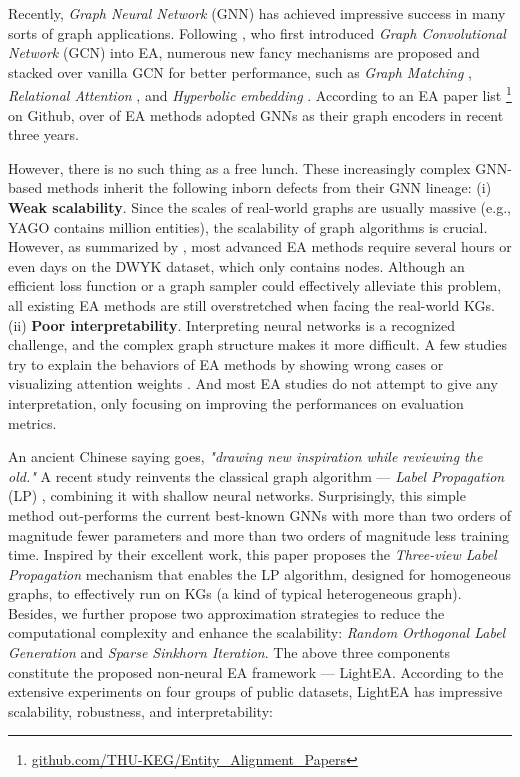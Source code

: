 \documentclass[11pt]{article}
\begin{document}
Recently, \emph{Graph Neural Network} (GNN) has achieved impressive success in many sorts of graph applications.
Following \citet{DBLP:conf/emnlp/WangLLZ18}, who first introduced \emph{Graph Convolutional Network} (GCN) into EA, numerous new fancy mechanisms are proposed and stacked over vanilla GCN for better performance, such as \emph{Graph Matching} \cite{DBLP:conf/iclr/FeyL0MK20}, \emph{Relational Attention} \cite{DBLP:conf/wsdm/MaoWXLW20}, and \emph{Hyperbolic embedding} \cite{DBLP:conf/emnlp/SunCHWDZ20}.
According to an EA paper list \footnote{\url{github.com/THU-KEG/Entity_Alignment_Papers}} on Github, over  of EA methods adopted GNNs as their graph encoders in recent three years.

However, there is no such thing as a free lunch.
These increasingly complex GNN-based methods inherit the following inborn defects from their GNN lineage:
(i) \textbf{Weak scalability}.
Since the scales of real-world graphs are usually massive (e.g., YAGO \cite{DBLP:conf/www/SuchanekKW07} contains  million entities), the scalability of graph algorithms is crucial.
However, as summarized by \citet{9174835}, most advanced EA methods require several hours \cite{DBLP:conf/ijcai/SunHZQ18, DBLP:conf/acl/CaoLLLLC19} or even days \cite{DBLP:conf/acl/XuWYFSWY19} on the DWYK dataset, which only contains  nodes.
Although an efficient loss function \cite{DBLP:conf/www/MaoWWL21} or a graph sampler \cite{DBLP:journals/corr/abs-2205-10312} could effectively alleviate this problem, all existing EA methods are still overstretched when facing the real-world KGs.
(ii) \textbf{Poor interpretability}.
Interpreting neural networks is a recognized challenge, and the complex graph structure makes it more difficult.
A few studies try to explain the behaviors of EA methods by showing wrong cases \cite{DBLP:conf/emnlp/YangZSLLS19} or visualizing attention weights \cite{DBLP:conf/acl/WuLFWZ20}.
And most EA studies \cite{DBLP:conf/ijcai/SunHZQ18, DBLP:conf/acl/XuWYFSWY19, DBLP:conf/cikm/MaoWXWL20} do not attempt to give any interpretation, only focusing on improving the performances on evaluation metrics.

An ancient Chinese saying goes, \emph{"drawing new inspiration while reviewing the old."}
A recent study \cite{DBLP:conf/iclr/HuangHSLB21} reinvents the classical graph algorithm --- \emph{Label Propagation} (LP) \cite{Zhu2002LearningFL}, combining it with shallow neural networks.
Surprisingly, this simple method out-performs the current best-known GNNs with more than two orders of magnitude fewer parameters and more than two orders of magnitude less training time.
Inspired by their excellent work, this paper proposes the \emph{Three-view Label Propagation} mechanism that enables the LP algorithm, designed for homogeneous graphs, to effectively run on KGs (a kind of typical heterogeneous graph).
Besides, we further propose two approximation strategies to reduce the computational complexity and enhance the scalability:
\emph{Random Orthogonal Label Generation} and \emph{Sparse Sinkhorn Iteration}.
The above three components constitute the proposed non-neural EA framework --- LightEA.
According to the extensive experiments on four groups of public datasets, LightEA has impressive scalability, robustness, and interpretability:
\end{document}
